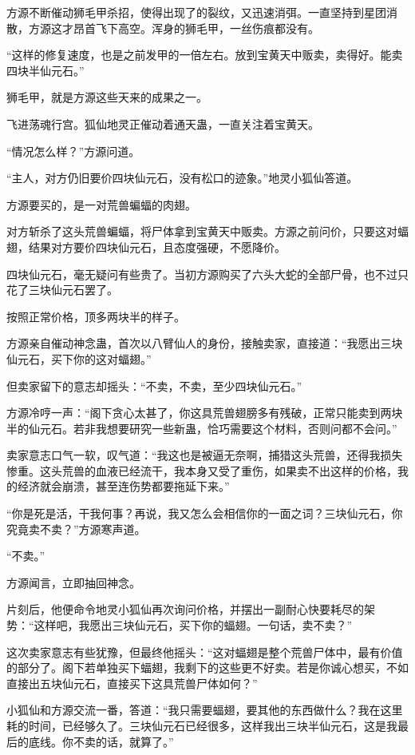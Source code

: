 \begin{this_body}
方源不断催动狮毛甲杀招，使得出现了的裂纹，又迅速消弭。一直坚持到星团消散，方源这才昂首飞下高空。浑身的狮毛甲，一丝伤痕都没有。

“这样的修复速度，也是之前发甲的一倍左右。放到宝黄天中贩卖，卖得好。能卖四块半仙元石。”

狮毛甲，就是方源这些天来的成果之一。

飞进荡魂行宫。狐仙地灵正催动着通天蛊，一直关注着宝黄天。

“情况怎么样？”方源问道。

“主人，对方仍旧要价四块仙元石，没有松口的迹象。”地灵小狐仙答道。

方源要买的，是一对荒兽蝙蝠的肉翅。

对方斩杀了这头荒兽蝙蝠，将尸体拿到宝黄天中贩卖。方源之前问价，只要这对蝠翅，结果对方要价四块仙元石，且态度强硬，不愿降价。

四块仙元石，毫无疑问有些贵了。当初方源购买了六头大蛇的全部尸骨，也不过只花了三块仙元石罢了。

按照正常价格，顶多两块半的样子。

方源亲自催动神念蛊，首次以八臂仙人的身份，接触卖家，直接道：“我愿出三块仙元石，买下你的这对蝠翅。”

但卖家留下的意志却摇头：“不卖，不卖，至少四块仙元石。”

方源冷哼一声：“阁下贪心太甚了，你这具荒兽翅膀多有残破，正常只能卖到两块半的仙元石。若非我想要研究一些新蛊，恰巧需要这个材料，否则问都不会问。”

卖家意志口气一软，叹气道：“我这也是被逼无奈啊，捕猎这头荒兽，还得我损失惨重。这头荒兽的血液已经流干，我本身又受了重伤，如果卖不出这样的价格，我的经济就会崩溃，甚至连伤势都要拖延下来。”

“你是死是活，干我何事？再说，我又怎么会相信你的一面之词？三块仙元石，你究竟卖不卖？”方源寒声道。

“不卖。”

方源闻言，立即抽回神念。

片刻后，他便命令地灵小狐仙再次询问价格，并摆出一副耐心快要耗尽的架势：“这样吧，我愿出三块仙元石，买下你的蝠翅。一句话，卖不卖？”

这次卖家意志有些犹豫，但最终他摇头：“这对蝠翅是整个荒兽尸体中，最有价值的部分了。阁下若单独买下蝠翅，我剩下的这些更不好卖。若是你诚心想买，不如直接出五块仙元石，直接买下这具荒兽尸体如何？”

小狐仙和方源交流一番，答道：“我只需要蝠翅，要其他的东西做什么？我在这里耗的时间，已经够久了。三块仙元石已经很多，这样我出三块半仙元石，这是我最后的底线。你不卖的话，就算了。”


\end{this_body}
